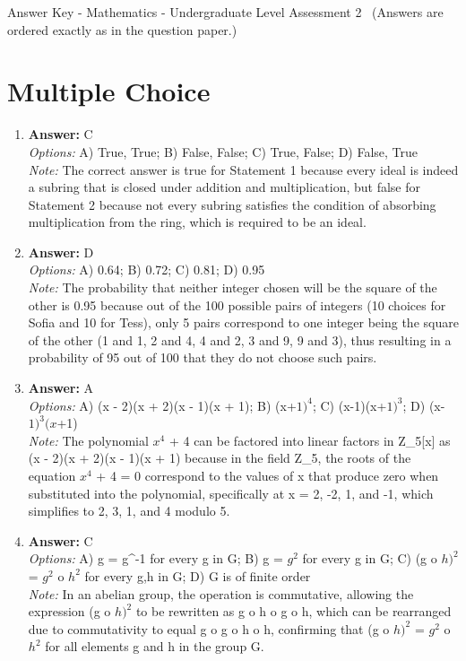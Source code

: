 \documentclass[12pt]{article}
\begin{document}
\begin{center}
Answer Key - Mathematics - Undergraduate Level Assessment 2 \
\small (Answers are ordered exactly as in the question paper.)
\end{center}

\section*{Multiple Choice}
\begin{enumerate}[label=\arabic*.]
\item \textbf{Answer:} C
\\ \textit{Options:} A) True, True; B) False, False; C) True, False; D) False, True
\\ \textit{Note:} The correct answer is true for Statement 1 because every ideal is indeed a subring that is closed under addition and multiplication, but false for Statement 2 because not every subring satisfies the condition of absorbing multiplication from the ring, which is required to be an ideal.
\item \textbf{Answer:} D
\\ \textit{Options:} A) 0.64; B) 0.72; C) 0.81; D) 0.95
\\ \textit{Note:} The probability that neither integer chosen will be the square of the other is 0.95 because out of the 100 possible pairs of integers (10 choices for Sofia and 10 for Tess), only 5 pairs correspond to one integer being the square of the other (1 and 1, 2 and 4, 4 and 2, 3 and 9, 9 and 3), thus resulting in a probability of 95 out of 100 that they do not choose such pairs.
\item \textbf{Answer:} A
\\ \textit{Options:} A) (x - 2)(x + 2)(x - 1)(x + 1); B) (x+$1)^4$; C) (x-1)(x+$1)^3$; D) (x-$1)^3(x$+1)
\\ \textit{Note:} The polynomial $x^4$ + 4 can be factored into linear factors in Z\_5[x] as (x - 2)(x + 2)(x - 1)(x + 1) because in the field Z\_5, the roots of the equation $x^4$ + 4 = 0 correspond to the values of x that produce zero when substituted into the polynomial, specifically at x = 2, -2, 1, and -1, which simplifies to 2, 3, 1, and 4 modulo 5.
\item \textbf{Answer:} C
\\ \textit{Options:} A) g = g^-1 for every g in G; B) g = $g^2$ for every g in G; C) (g o $h)^2$ = $g^2$ o $h^2$ for every g,h in G; D) G is of finite order
\\ \textit{Note:} In an abelian group, the operation is commutative, allowing the expression (g o $h)^2$ to be rewritten as g o h o g o h, which can be rearranged due to commutativity to equal g o g o h o h, confirming that (g o $h)^2$ = $g^2$ o $h^2$ for all elements g and h in the group G.

\end{enumerate}
\end{document}
